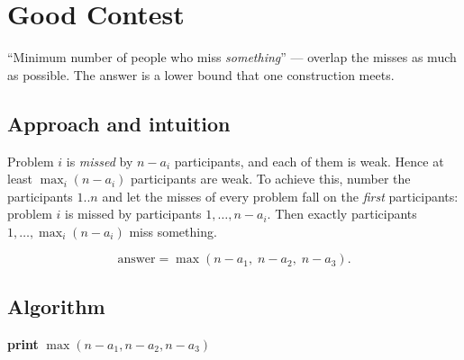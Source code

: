 \section{Good Contest}
\label{sec:g-good-contest}


\begin{patternbox}
``Minimum number of people who miss \emph{something}'' --- overlap the
misses as much as possible. The answer is a lower bound that one
construction meets.
\end{patternbox}

\subsection*{Approach and intuition}

Problem $i$ is \emph{missed} by $n-a_i$ participants, and each of them is
weak. Hence at least $\max_i(n-a_i)$ participants are weak. To achieve this,
number the participants $1..n$ and let the misses of every problem fall on
the \emph{first} participants: problem $i$ is missed by participants
$1,\dots,n-a_i$. Then exactly participants $1,\dots,\max_i(n-a_i)$ miss
something.

\begin{ideabox}
\[
  \text{answer} = \max(n-a_1,\;n-a_2,\;n-a_3).
\]
\end{ideabox}

\subsection*{Algorithm}
\begin{algorithmic}[1]
  \State \textbf{print} $\max(n-a_1,n-a_2,n-a_3)$
\EndFor
\end{algorithmic}


